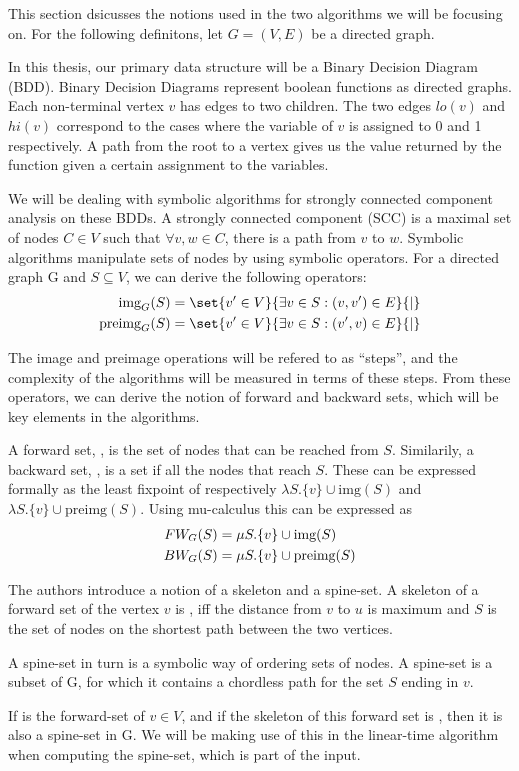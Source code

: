 \documentclass[../master/master.tex]{subfiles}
\begin{document}
This section dsicusses the notions used in the two algorithms we will be focusing on. For the following definitons, let $G=(V,E)$ be a directed graph.

In this thesis, our primary data structure will be a Binary Decision Diagram (BDD). Binary Decision Diagrams represent boolean functions as directed graphs. Each non-terminal vertex $v$ has edges to two children. The two edges $lo(v)$ and $hi(v)$ correspond to the cases where the variable of $v$ is assigned to 0 and 1 respectively. A path from the root to a vertex gives us the value returned by the function given a certain assignment to the variables. 

We will be dealing with symbolic algorithms for strongly connected component analysis on these BDDs. A strongly connected component (SCC) is a maximal set of nodes $C\in V$ such that $\forall v,w\in C$, there is a path from $v$ to $w$. Symbolic algorithms manipulate sets of nodes by using symbolic operators. For a directed graph G and $S\subseteq V$, we can derive the following operators: 
\begin{align*}
\img S &= \set{v' \in V}{\exists v\in S:(v, v')\in E}{|}\\
\pre S &= \set{v' \in V}{\exists v\in S:(v', v)\in E}{|}
\end{align*}

The image and preimage operations will be refered to as ``steps'', and the complexity of the algorithms will be measured in terms of these steps. 
From these operators, we can derive the notion of forward and backward sets, which will be key elements in the algorithms.

A forward set, , is the set of nodes that can be reached from $S$. Similarily, a backward set, , is a set if all the nodes that reach $S$. These can be expressed formally as the least fixpoint of respectively $\lambda S.\{v\}\cup \text{img}(S)$ and $\lambda S.\{v\}\cup \text{preimg}(S)$. Using mu-calculus \cite{clarke_peled_grumberg_1999} this can be expressed as 
\begin{align}\label{fw}
FW_{G}(S) &= \mu S.\{v\}\cup \text{img}(S)\\
\label{bw}BW_{G}(S) &= \mu S.\{v\}\cup \text{preimg}(S)
\end{align}

The authors \cite{linear} introduce a notion of a skeleton and a spine-set. A skeleton of a forward set of the vertex $v$  is , iff the distance from $v$ to $u$ is maximum and $S$ is the set of nodes on the shortest path between the two vertices.

A spine-set in turn is a symbolic way of ordering sets of nodes. A spine-set is a subset  of G, for which it contains a chordless path for the set $S$ ending in $v$.

If  is the forward-set of $v \in V$, and if the skeleton of this forward set is , then it is also a spine-set in G. We will be making use of this in the linear-time algorithm when computing the spine-set, which is part of the input. 
\end{document}

